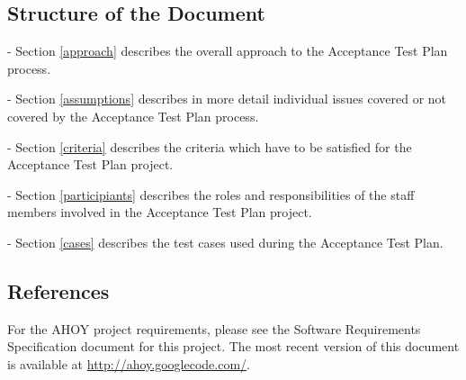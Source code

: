 \documentclass[titlepage]{article}
\begin{document}
\subsection{Structure of the Document%
    \label{structure}%
}
    \begin{itemize*}
        \item[-]Section \ref{approach} describes the overall approach to the Acceptance Test Plan process.
        \item[-]Section \ref{assumptions} describes in more detail individual issues covered or not covered by the Acceptance Test Plan process.
        \item[-]Section \ref{criteria} describes the criteria which have to be satisfied for the Acceptance Test Plan project.
        \item[-]Section \ref{participiants} describes the roles and responsibilities of the staff members involved in the Acceptance Test Plan project.
        \item[-]Section \ref{cases} describes the test cases used during the Acceptance Test Plan.
    \end{itemize*}


\subsection{References%
    \label{references}%
}
    For the AHOY project requirements, please see the Software Requirements Specification document for this project. The most recent version of this document is available at \url{http://ahoy.googlecode.com/}.

\end{document}
